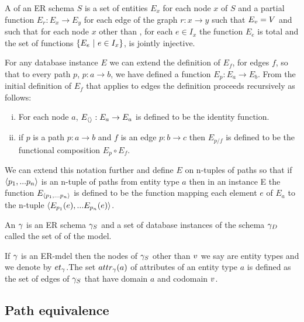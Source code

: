 \begin{definition}
\noindent A   of an ER schema $S$ is
a set of entities $E_x$ for each node $x$ of $S$ and 
a partial function $E_r : E_x \rightarrow E_y$ for each edge of the graph $r:x \rightarrow y$ 
such that $E_v=V$
and such that 
for each node $x$ other than \veee, for each $e \in I_x$ the function $E_e$ is total and
the set of functions $\left\{E_e \ \middle|\ e \in I_x\right\}$, is jointly injective.
\end{definition}

\noindent For any database instance $E$ we can  extend  the definition of
$E_f$, for edges $f$,  so that to every path $p$, $p: a \rightarrow b$,  we have defined a function $E_p: E_a \rightarrow E_b$. From the initial definition of $E_f$ that applies to 
edges the definition proceeds recursively as follows: 
\begin{enumerate} [(i)]
\item{  For each node $a$, $E_{\langle\rangle}: E_a \rightarrow E_a$ is defined to be the identity function.
}
\item{   if $p$ is a path $p: a \rightarrow b$ and $f$ is an edge $p: b \rightarrow c$ then $E_{p/f}$  
is defined to be the functional composition $E_p \circ E_f$. 
}
\end{enumerate}

We can extend this notation further and define $E$ on n-tuples of paths so that if 
$\langle p_1,...p_n\rangle$ is an n-tuple of paths from entity type $a$ then in an instance E
the function  $E_{\langle p_1,...p_n\rangle}$ is defined to be the function mapping each element $e$ 
of $E_a$ to the n-tuple
$\langle E_{p_1}(e),...E_{p_n}(e)\rangle$.

\begin{definition}
\noindent An  $\gamma$ is an ER schema $\gamma_S$ and a set of database instances of the schema $\gamma_D$ called the set of
 of the model. \\
\end{definition}

If $\gamma$ is an ER-mdel then the nodes of $\gamma_S$ other than $v$ we say are entity types and we denote by $et_{\gamma}$.The set $attr_{\gamma}(a)$ of attributes of an entity type $a$ is defined as the set of edges of $\gamma_S$ that have 
domain $a$  and  codomain $v$.

\subsection{Path equivalence}
\label{equivalencedefinition}

